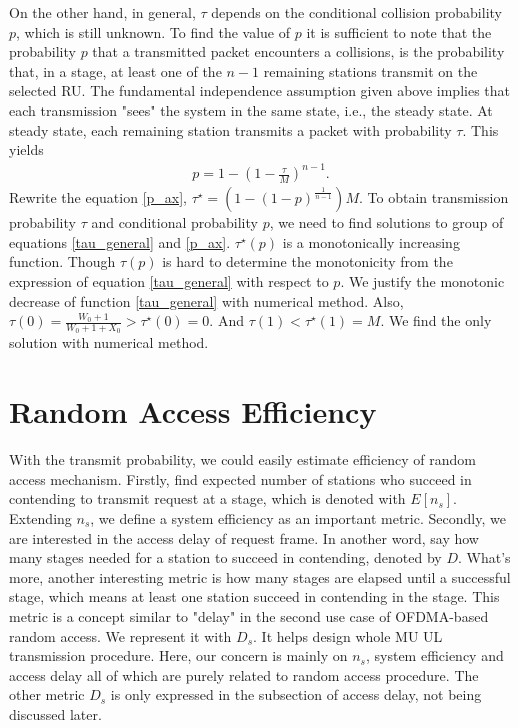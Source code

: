 On the other hand, in general, $\tau$ depends on the conditional collision probability $p$, which is still unknown. To find the value of $p$ it is sufficient to note that the probability $p$ that a transmitted packet encounters a collisions, is the probability that, in a stage, at least one of the $n-1$ remaining stations transmit on the selected RU. 
The fundamental independence assumption given above implies that each transmission "sees" the system in the same state, i.e., the steady state. 
At steady state, each remaining station transmits a packet with probability $\tau$. This yields 
\begin{align}
\label{p_ax}
p = 1-\left( 1-\frac{\tau}{M} \right)^{n-1}.
\end{align}
Rewrite the equation \ref{p_ax}, $\tau^\star = \left(1-(1-p)^\frac{1}{n-1} \right)M$. 
To obtain transmission probability $\tau$ and conditional probability $p$, we need to find solutions to group of equations \ref{tau_general} and \ref{p_ax}.
$\tau^\star(p)$ is a monotonically increasing function. 
Though $\tau(p)$ is hard to determine the monotonicity from the expression of equation \ref{tau_general} with respect to $p$. 
We justify the monotonic decrease of function \ref{tau_general} with numerical method. 
Also, $\tau(0) = \frac{W_0+1}{W_0+1+X_0}> \tau^\star(0) = 0$.
And $\tau(1) < \tau^\star(1) = M$. We find the only solution with numerical method.



\section{Random Access Efficiency} \label{sec_metric}
With the transmit probability, we could easily estimate efficiency of random access mechanism. 
Firstly, find expected number of stations who succeed in contending to transmit request at a stage, which is denoted with $E[n_s]$. 
Extending $n_s$, we define a system efficiency as an important metric.
Secondly, we are interested in the access delay of request frame. 
In another word, say how many stages needed for a station to succeed in contending, denoted by $D$.
What's more, another interesting metric is how many stages are elapsed until a successful stage, which means at least one station succeed in contending in the stage. This metric is a concept similar to "delay" in the second use case of OFDMA-based random access. We represent it with $D_s$. It helps design whole MU UL transmission procedure. 
Here, our concern is mainly on $n_s$, system efficiency and access delay all of which are purely related to random access procedure. The other metric $D_s$ is only expressed in the subsection of access delay, not being discussed later. 


